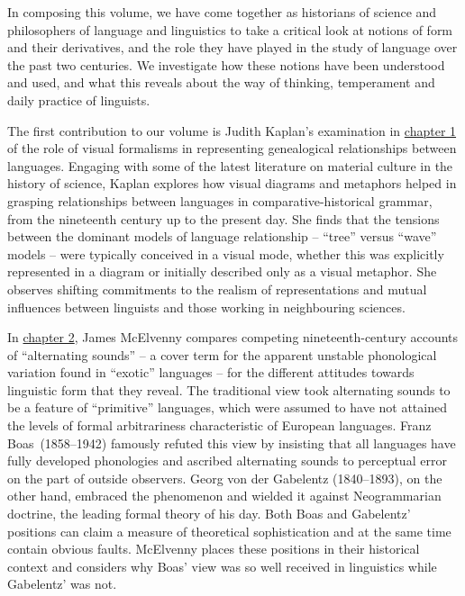 \documentclass[output=paper]{langscibook}
\begin{document}
In composing this volume, we have come together as historians of science and philosophers of language and linguistics to take a critical look at notions of form and their derivatives, and the role they have played in the study of language over the past two centuries. We investigate how these notions have been understood and used, and what this reveals about the way of thinking, temperament and daily practice of linguists.

The first contribution to our volume is Judith Kaplan's examination in \hyperref[chap:kaplan]{chapter 1} of the role of visual formalisms in representing genealogical relationships between languages. Engaging with some of the latest literature on material culture in the history of science, Kaplan explores how visual diagrams and metaphors helped in grasping relationships between languages in comparative-historical grammar, from the nineteenth century up to the present day. She finds that the tensions between the dominant models of language relationship – ``tree'' versus ``wave'' models – were typically conceived in a visual mode, whether this was explicitly represented in a diagram or initially described only as a visual metaphor. She observes shifting commitments to the realism of representations and mutual influences between linguists and those working in neighbouring sciences.

In \hyperref[chap:mcelvenny]{chapter 2}, James McElvenny compares competing nineteenth-century accounts of ``alternating sounds'' – a cover term for the apparent unstable phonological variation found in ``exotic'' languages – for the different attitudes towards linguistic form that they reveal. The traditional view took alternating sounds to be a feature of ``primitive'' languages, which were assumed to have not attained the levels of formal arbitrariness characteristic of European languages. Franz Boas~(1858–1942) famously refuted this view by insisting that all languages have fully developed phonologies and ascribed alternating sounds to perceptual error on the part of outside observers. Georg von der Gabelentz (1840–1893), on the other hand, embraced the phenomenon and wielded it against Neogrammarian doctrine, the leading formal theory of his day. Both Boas and Gabelentz' positions can claim a measure of theoretical sophistication and at the same time contain obvious faults. McElvenny places these positions in their historical context and considers why Boas' view was so well received in linguistics while Gabelentz' was not.
\end{document}
